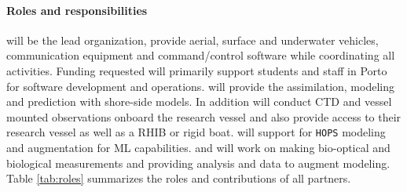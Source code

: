 
\paragraph{Roles and responsibilities} \univ will be the lead
organization, provide aerial, surface and underwater vehicles,
communication equipment and command/control software while
coordinating all activities. Funding requested will primarily support
students and staff in Porto for software development and operations.
\inst will provide the assimilation, modeling and prediction with
shore-side models. In addition \inst will conduct CTD and vessel
mounted observations onboard the research vessel and also provide
access to their research vessel as well as a RHIB or rigid boat. \mit
will support \inst for \texttt{HOPS} modeling and augmentation for ML
capabilities. \colo and \ave will work on making bio-optical and
biological measurements and providing analysis and data to augment
\inst modeling. Table \ref{tab:roles} summarizes the roles and
contributions of all partners.



